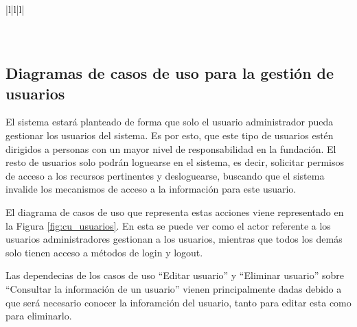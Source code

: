 \begin{table}[H]
{\begin{tabular}{|l|l|l|}
            \hline
                                                                                                                                                                                                                                                                                              \\ 
            \hline
                                                                                                                                                                                                                                    \\ 
            \hline
                                                                                                                                                                 \\
            \hline
        \end{tabular}
    }
    \caption{Descripción del usuario invitado}
\end{table}

\subsection{Diagramas de casos de uso para la gestión de usuarios}

El sistema estará planteado de forma que solo el usuario administrador pueda gestionar los usuarios del sistema. Es por esto, que este tipo de usuarios estén dirigidos a personas con un mayor nivel de responsabilidad en la fundación. El resto de usuarios solo podrán loguearse en el sistema, es decir, solicitar permisos de acceso a los recursos pertinentes y desloguearse, buscando que el sistema invalide los mecanismos de acceso a la información para este usuario.

El diagrama de casos de uso que representa estas acciones viene representado en la Figura \ref{fig:cu_usuarios}. En esta se puede ver como el actor referente a los usuarios administradores gestionan a los usuarios, mientras que todos los demás solo tienen acceso a métodos de login y logout. 

Las dependecias de los casos de uso ``Editar usuario'' y ``Eliminar usuario'' sobre ``Consultar la información de un usuario'' vienen principalmente dadas debido a que será necesario conocer la inforamción del usuario, tanto para editar esta como para eliminarlo. 

